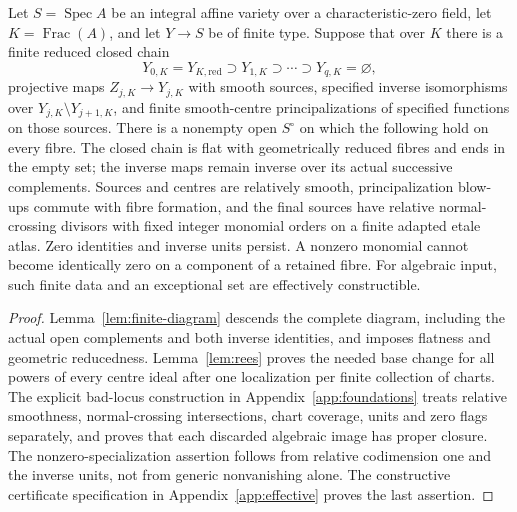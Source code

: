 \begin{lemma}\label{lem:spread}
Let $S=\operatorname{Spec}A$ be an integral affine variety over a
characteristic-zero field, let $K=\operatorname{Frac}(A)$, and let
$Y\to S$ be of finite type. Suppose that over $K$ there is a finite
reduced closed chain
\[
 Y_{0,K}=Y_{K,\mathrm{red}}\supset Y_{1,K}\supset\cdots
                 \supset Y_{q,K}=\varnothing,
\]
projective maps $Z_{j,K}\to Y_{j,K}$ with smooth sources, specified
inverse isomorphisms over $Y_{j,K}\setminus Y_{j+1,K}$, and finite
smooth-centre principalizations of specified functions on those sources.
There is a nonempty open $S^\circ$ on which the following hold on every
fibre. The closed chain is flat with geometrically reduced fibres and
ends in the empty set; the inverse maps remain inverse over its actual
successive complements. Sources and centres are relatively smooth,
principalization blow-ups commute with fibre formation, and the final
sources have relative normal-crossing divisors with fixed integer
monomial orders on a finite adapted etale atlas. Zero identities and
inverse units persist. A nonzero monomial cannot become identically zero
on a component of a retained fibre. For algebraic input, such finite
data and an exceptional set are effectively constructible.
\end{lemma}
\begin{proof}
Lemma~\ref{lem:finite-diagram} descends the complete diagram, including
the actual open complements and both inverse identities, and imposes
flatness and geometric reducedness. Lemma~\ref{lem:rees} proves the
needed base change for all powers of every centre ideal after one
localization per finite collection of charts. The explicit bad-locus
construction in Appendix~\ref{app:foundations} treats relative
smoothness, normal-crossing intersections, chart coverage, units and
zero flags separately, and proves that each discarded algebraic image
has proper closure. The nonzero-specialization assertion follows from
relative codimension one and the inverse units, not from generic
nonvanishing alone. The constructive certificate specification in
Appendix~\ref{app:effective} proves the last assertion.
\end{proof}

